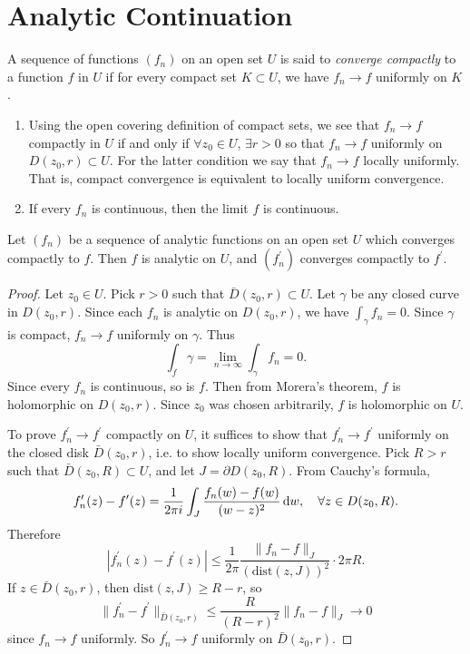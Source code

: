 \section{Analytic Continuation}

\begin{defn}
A sequence of functions $(f_n)$ on an open set $U$ is said
to \emph{converge compactly} to a function $f$ in $U$ if
for every compact set $K \subset U$, we have
$f_n \to f$ uniformly on $K$.
\end{defn}

\begin{remark}
  \begin{enumerate}
    \item{
      Using the open covering definition of compact sets,
      we see that $f_n \to f$ compactly in $U$ if and only
      if $\forall z_0 \in U$, $\exists r > 0$ so that
      $f_n \to f$ uniformly on $D(z_0, r) \subset U$.
      For the latter condition we say that
      $f_n \to f$ locally uniformly. That is, compact
      convergence is equivalent to locally uniform convergence.
    }
    \item{
      If every $f_n$ is continuous, then the limit $f$ is
      continuous.
    }
  \end{enumerate}
\end{remark}

\begin{theorem}
Let $(f_n)$ be a sequence of analytic functions on an open set $U$
which converges compactly to $f$. Then $f$ is analytic on $U$, and
$(f_n^\prime)$ converges compactly to $f^\prime$.
\end{theorem}

\begin{proof}
Let $z_0 \in U$. Pick $r > 0$ such that $\bar{D}(z_0, r) \subset U$.
Let $\gamma$ be any closed curve in $D(z_0, r)$. Since each $f_n$ is
analytic on $D(z_0, r)$, we have $\int_\gamma f_n = 0$. Since
$\gamma$ is compact, $f_n \to f$ uniformly on $\gamma$. Thus
$$
  \int_f \gamma
= \lim_{n \to \infty} \int_\gamma f_n
= 0.
$$
Since every $f_n$ is continuous, so is $f$. Then from Morera's
theorem, $f$ is holomorphic on $D(z_0, r)$. Since $z_0$ was chosen
arbitrarily, $f$ is holomorphic on $U$.

To prove $f_n^\prime \to f^\prime$ compactly on $U$, it suffices to
show that $f_n^\prime \to f^\prime$ uniformly on the closed disk
$\bar{D}(z_0, r)$, i.e. to show locally uniform convergence.
Pick $R > r$ such that $\bar{D}(z_0, R) \subset U$, and let
$J = \partial D(z_0, R)$. From Cauchy's formula,
$$
  f_n^\prime(z) - f^\prime(z)
= \frac{1}{2 \pi i}
  \int_J
    \frac{f_n(w) - f(w)}
         {(w - z)^2}
    \mathop{}\!\mathrm{d} w, \quad
\forall z \in D(z_0, R).
$$
Therefore
$$
     |f_n^\prime(z) - f^\prime(z)|
\leq \frac{1}{2 \pi}
     \frac{\| f_n - f \|_J}
          {(\mathrm{dist}(z, J))^2}
     \cdot 2 \pi R.
$$
If $z \in \bar{D}(z_0, r)$, then
$\mathrm{dist}(z, J) \geq R - r$, so
$$
     \|f_n^\prime - f^\prime\|_{\bar{D}(z_0, r)}
\leq \frac{R}{(R - r)^2}
     \|f_n - f\|_J
\to 0
$$
since $f_n \to f$ uniformly. So
$f_n^\prime \to f$ uniformly on $\bar{D}(z_0, r)$.
\end{proof}

